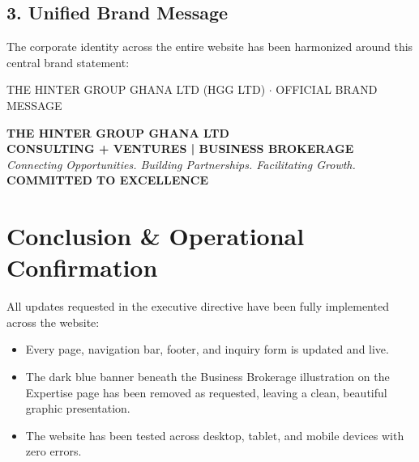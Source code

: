 \documentclass[11pt,a4paper]{article}
\begin{document}
\vspace{0.1cm}

\subsection{3. Unified Brand Message}
The corporate identity across the entire website has been harmonized around this central brand statement:

\begin{UserFriendlyBox}{THE HINTER GROUP GHANA LTD (HGG LTD) $\cdot$ OFFICIAL BRAND MESSAGE}
\begin{center}
    {\large\textbf{\color{HGGNavy}THE HINTER GROUP GHANA LTD}}\\[0.08cm]
    {\normalsize\textbf{\color{HGGGold}CONSULTING + VENTURES \color{HGGNavy}| \color{HGGGold}BUSINESS BROKERAGE}}\\[0.15cm]
    {\normalsize\textit{\color{HGGAccentBlue}Connecting Opportunities. Building Partnerships. Facilitating Growth.}}\\[0.1cm]
    {\small\textbf{\color{HGGNavy}COMMITTED TO EXCELLENCE}}
\end{center}
\end{UserFriendlyBox}

\vspace{0.15cm}

\section{Conclusion \& Operational Confirmation}

All updates requested in the executive directive have been fully implemented across the website:
\begin{itemize}[leftmargin=*,noitemsep,topsep=2pt]
    \item Every page, navigation bar, footer, and inquiry form is updated and live.
    \item The dark blue banner beneath the Business Brokerage illustration on the Expertise page has been removed as requested, leaving a clean, beautiful graphic presentation.
    \item The website has been tested across desktop, tablet, and mobile devices with zero errors.
\end{itemize}
\end{document}
